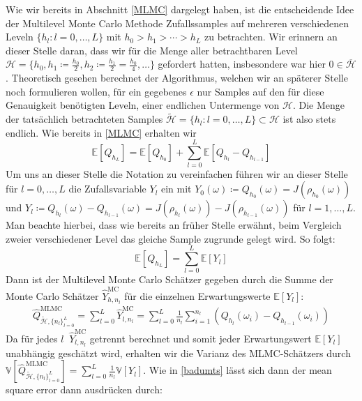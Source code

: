 Wie wir bereits in Abschnitt \ref{MLMC} dargelegt haben, ist die entscheidende Idee der Multilevel Monte Carlo Methode Zufallssamples auf mehreren verschiedenen Leveln $ \{ h_l : l = 0,\dots,L \} $ mit $ h_0 > h_1 > \cdots > h_L $ zu betrachten. Wir erinnern an dieser Stelle daran, dass wir für die Menge aller betrachtbaren Level $ \mathcal{H} = \{ h_0 , h_1 \coloneqq \frac{h_0}{2},h_2 \coloneqq \frac{h_1}{2} = \frac{h_0}{4}, \dots \} $ gefordert hatten, insbesondere war hier $0 \in \overline{\mathcal{H}}$. Theoretisch gesehen berechnet der Algorithmus, welchen wir an späterer Stelle noch formulieren wollen, für ein gegebenes $ \epsilon $ nur Samples auf den für diese Genauigkeit benötigten Leveln, einer endlichen Untermenge von $ \mathcal{H} $. Die Menge der tatsächlich betrachteten Samples $ \tilde{\mathcal{H}} = \{ h_l : l = 0,\dots,L \} \subset \mathcal{H} $ ist also stets endlich.
Wie bereits in \ref{MLMC} erhalten wir 
\[
\mathbb{E}[Q_{h_L}] = \mathbb{E}[Q_{h_0}] + \sum_ {l=0}^L \mathbb{E}[Q_{h_l}-Q_{h_{l-1}}]  
\]
Um uns an dieser Stelle die Notation zu vereinfachen führen wir an dieser Stelle für $ l=0,\dots,L $ die Zufallsvariable $ Y_l $ ein mit $ Y_0(\omega) \coloneqq Q_{h_0}(\omega) = J(\rho_{h_0}(\omega)) $ und $ Y_l \coloneqq Q_{h_l}(\omega) - Q_{h_{l-1}}(\omega) =  J(\rho_{h_l}(\omega)) - J(\rho_{h_{l-1}}(\omega))  $ für $ l=1,\dots,L $. Man beachte hierbei, dass wie bereits an früher Stelle erwähnt, beim Vergleich zweier verschiedener Level das gleiche Sample zugrunde gelegt wird. 
So folgt:
\[
	\mathbb{E}[Q_{h_L}] = \sum_{l=0}^L \mathbb{E}[Y_l]
\]
Dann ist der Multilevel Monte Carlo Schätzer gegeben durch die Summe der Monte Carlo Schätzer $ \widehat{Y}_{h,n_l}^{\text{MC}} $ für die einzelnen Erwartungswerte $ \mathbb{E}[Y_l] $:
\begin{align}
	\widehat{Q}_{\tilde{\mathcal{H}},\{ n_l \}_{l=0}^L }^{\text{MLMC}} = \sum_{l=0}^{L} \widehat{Y}_{l,n_l}^{\text{MC}} =  \sum_{l=0}^{L} \frac{1}{n_l} \sum_{i=1}^{n_l} \left( Q_{h_l}(\omega_i) - Q_{h_{l-1}}(\omega_i)\right)
\end{align}
Da für jedes $ l \ $ $ \widehat{Y}_{l,n_l}^{\text{MC}} $ getrennt berechnet und somit jeder Erwartungswert $ \mathbb{E}[Y_l] $ unabhängig geschätzt wird, erhalten wir die Varianz des MLMC-Schätzers durch $\mathbb{V}[ \widehat{Q}_{\tilde{\mathcal{H}},\{ n_l \}_{l=0}^L }^{\text{MLMC}} ] = \sum_{l=0}^{L} \frac{1}{n_l} \mathbb{V}[Y_l]$. Wie in \ref{badumts} lässt sich dann der mean square error dann ausdrücken durch:
